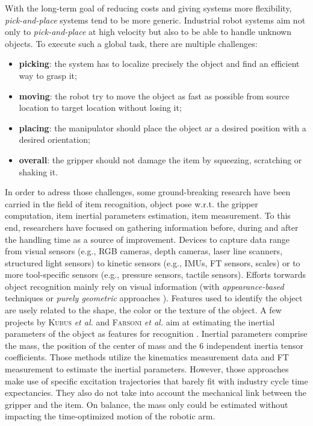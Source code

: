 \documentclass[/home/francois/latex/report/main.tex]{subfiles}
\begin{document}
With the long-term goal of reducing costs and giving systems more flexibility, \textit{pick-and-place} systems tend to be more generic. Industrial robot systems aim not only to \textit{pick-and-place} at high velocity but also to be able to handle unknown objects. To execute such a global task, there are multiple challenges:
\begin{itemize}
	\item \textbf{picking}: the system has to localize precisely the object and find an efficient way to grasp it;
	\item \textbf{moving}: the robot try to move the object as fast as possible from source location to target location without losing it;
	\item \textbf{placing}: the manipulator should place the object ar a desired position with a desired orientation;
	\item \textbf{overall}: the gripper should not damage the item by squeezing, scratching or shaking it.
\end{itemize}

In order to adress those challenges, some ground-breaking research have been carried in the field of item recognition, object pose w.r.t. the gripper computation, item inertial parameters estimation, item measurement. To this end, researchers have focused on gathering information before, during and after the handling time as a source of improvement. Devices to capture data range from visual sensors (e.g., RGB cameras, depth cameras, laser line scanners, structured light sensors) to kinetic sensors (e.g., \ac{IMUs}, \ac{FT} sensors, scales) or to more tool-specific sensors (e.g., pressure sensors, tactile sensors). Efforts torwards object recognition mainly rely on visual information (with \textit{appearance-based} techniques \cite{Carmichael2002, Schmid1997, Viola2001, Murase1993} or \textit{purely geometric} approaches \cite{Hut1987, Sethi2001}). Features used to identify the object are usely related to the shape, the color or the texture of the object. A few projects by \textsc{Kubus} \textit{et al.} and \textsc{Farsoni} \textit{et al.} aim at estimating the inertial parameters of the object as features for recognition \cite{Kubus2008, Kubus2007, Kubus2014, Farsoni2018}. Inertial parameters comprise the mass, the position of the center of mass and the 6 independent inertia tensor coefficients. Those methods utilize the kinematics measurement data and \ac{FT} measurement to estimate the inertial parameters. However, those approaches make use of specific excitation trajectories that barely fit with industry cycle time expectancies. They also do not take into account the mechanical link between the gripper and the item. On balance, the mass only could be estimated without impacting the time-optimized motion of the robotic arm.
\end{document}
